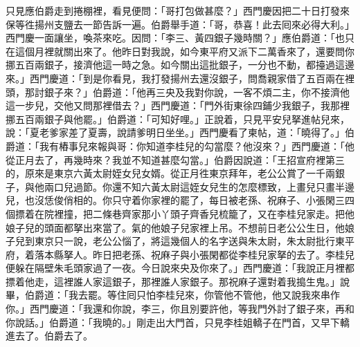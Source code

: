 只見應伯爵走到捲棚裡，看見便問：「哥打包做甚麼？」西門慶因把二十日打發來保等徃揚州支鹽去一節告訴一遍。伯爵舉手道：「哥，恭喜！此去囘來必得大利。」西門慶一面讓坐，喚茶來吃。因問：「李三、黃四銀子幾時關？」應伯爵道：「也只在這個月裡就關出來了。他昨日對我說，如今東平府又派下二萬香來了，還要問你挪五百兩銀子，接濟他這一時之急。如今關出這批銀子，一分也不動，都擡過這邊來。」西門慶道：「到是你看見，我打發揚州去還沒銀子，問喬親家借了五百兩在裡頭，那討銀子來？」伯爵道：「他再三央及我對你說，一客不煩二主，你不接濟他這一步兒，交他又問那裡借去？」西門慶道：「門外街東徐四鋪少我銀子，我那裡挪五百兩銀子與他罷。」伯爵道：「可知好哩。」正說着，只見平安兒拏進帖兒來，說：「夏老爹家差了夏壽，說請爹明日坐坐。」西門慶看了柬帖，道：「曉得了。」伯爵道：「我有樁事兒來報與哥：你知道李桂兒的勾當麼？他沒來？」西門慶道：「他從正月去了，再幾時來？我並不知道甚麼勾當。」伯爵因說道：「王招宣府裡第三的，原來是東京六黃太尉姪女兒女婿。從正月徃東京拜年，老公公賞了一千兩銀子，與他兩口兒過節。你還不知六黃太尉這姪女兒生的怎麼標致，上畫兒只畫半邊兒，也沒恁俊俏相的。你只守着你家裡的罷了，每日被老孫、祝麻子、小張閑三四個摽着在院裡撞，把二條巷齊家那小丫頭子齊香兒梳籠了，又在李桂兒家走。把他娘子兒的頭面都拏出來當了。氣的他娘子兒家裡上吊。不想前日老公公生日，他娘子兒到東京只一說，老公公惱了，將這幾個人的名字送與朱太尉，朱太尉批行東平府，着落本縣拏人。昨日把老孫、祝麻子與小張閑都從李桂兒家拏的去了。李桂兒便躲在隔壁朱毛頭家過了一夜。今日說來央及你來了。」西門慶道：「我說正月裡都摽着他走，這裡誰人家這銀子，那裡誰人家銀子。那祝麻子還對着我搗生鬼。」說畢，伯爵道：「我去罷。等住囘只怕李桂兒來，你管他不管他，他又說我來串作你。」西門慶道：「我還和你說，李三，你且別要許他，等我門外討了銀子來，再和你說話。」伯爵道：「我曉的。」剛走出大門首，只見李桂姐轎子在門首，又早下轎進去了。伯爵去了。

